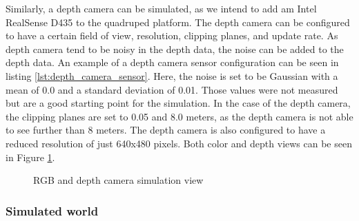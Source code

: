 \documentclass[12pt]{article}
\begin{document}
        Similarly, a depth camera can be simulated, as we intend to add am Intel RealSense D435 to the quadruped platform. The depth camera can be configured to have a certain field of view, resolution, clipping planes, and update rate. As depth camera tend to be noisy in the depth data, the noise can be added to the depth data. An example of a depth camera sensor configuration can be seen in listing \ref{lst:depth_camera_sensor}. Here, the noise is set to be Gaussian with a mean of 0.0 and a standard deviation of 0.01. Those values were not measured but are a good starting point for the simulation. In the case of the depth camera, the clipping planes are set to 0.05 and 8.0 meters, as the depth camera is not able to see further than 8 meters. The depth camera is also configured to have a reduced resolution of just 640x480 pixels. Both color and depth views can be seen in Figure \ref{fig:cameras_simulation_view}.
        


\begin{figure}[H]
    \centering
    \caption{RGB and depth camera simulation view}
    \label{fig:cameras_simulation_view}
\end{figure}

    \subsubsection{Simulated world}
\end{document}
